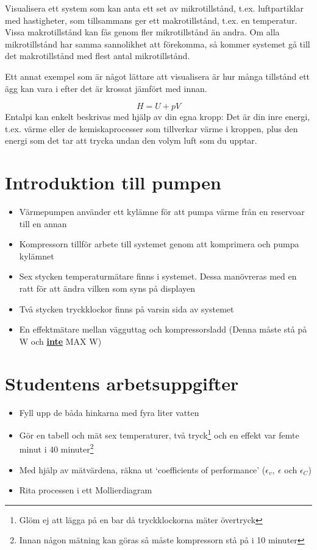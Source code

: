 \documentclass[11pt]{article}
\begin{document}
Visualisera ett system som kan anta ett set av mikrotillstånd, t.ex. luftpartiklar med hastigheter, som tillsammans ger ett makrotillstånd, t.ex. en temperatur. Vissa makrotillstånd kan fås genom fler mikrotillstånd än andra. Om alla mikrotillstånd har samma sannolikhet att förekomma, så kommer systemet gå till det makrotillstånd med flest antal mikrotillstånd.

Ett annat exempel som är något lättare att visualisera är hur många tillstånd ett ägg kan vara i efter det är krossat jämfört med innan.

\begin{equation}
    H = U + pV
\end{equation}
Entalpi kan enkelt beskrivas med hjälp av din egna kropp: Det är din inre energi, t.ex. värme eller de kemiskaprocesser som tillverkar värme i kroppen, plus den energi som det tar att trycka undan den volym luft som du upptar.  


\section{Introduktion till pumpen}

\begin{itemize}
    \item Värmepumpen använder ett kylämne för att pumpa värme från en reservoar till en annan
    \item Kompressorn tillför arbete till systemet genom att komprimera och pumpa kylämnet
    \item Sex stycken temperaturmätare finns i systemet. Dessa manövreras med en ratt för att ändra vilken som syns på displayen
    \item Två stycken tryckklockor finns på varsin sida av systemet  
    \item En effektmätare mellan vägguttag och kompressorsladd (Denna måste stå på W och \underline{\textbf{inte}} MAX W)
\end{itemize}

\section{Studentens arbetsuppgifter}

\begin{itemize}
    \item Fyll upp de båda hinkarna med fyra liter vatten
    \item Gör en tabell och mät sex temperaturer, två tryck\footnote{Glöm ej att lägga på en bar då tryckklockorna mäter övertryck} och en effekt var femte minut i 40 minuter\footnote{Innan någon mätning kan göras så måste kompressorn stå på i 10 minuter}
    \item Med hjälp av mätvärdena, räkna ut `coefficients of performance' ($\epsilon_v, \ \epsilon$ och $\epsilon_C$)
    \item Rita processen i ett Mollierdiagram
\end{itemize}
\end{document}
